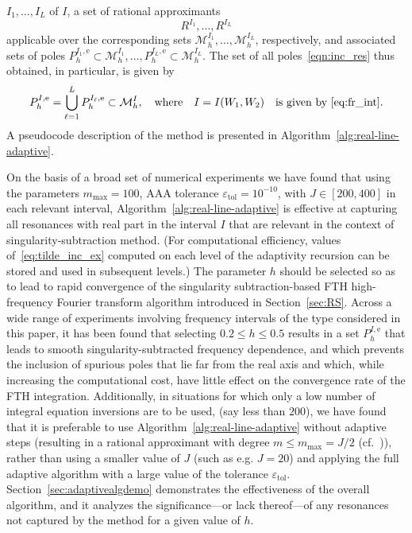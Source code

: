 \documentclass[11pt]{article}
\theoremstyle{plain}
\theoremstyle{remark}
\begin{document}
$I_1,\dots,I_L$ of $I$, a set of rational approximants
\begin{equation}\label{eqn:Rat_approx_set}
    R^{I_1},\dots, R^{I_L}
\end{equation}
applicable over the
corresponding sets $\mathcal{M}^{I_1}_h,\dots, \mathcal{M}^{I_L}_h$,
respectively, and associated sets of poles
$P_{h}^{I_1,\mathrm{e}}\subset \mathcal{M}^{I_1}_h,\dots,P_{h}^{I_L,\mathrm{e}}\subset
\mathcal{M}^{I_L}_h$. The set of all poles~\eqref{eqn:inc_res} thus obtained, in particular, is given by
\begin{equation}
  \label{eq:all_poles}
  P_{h}^{I,\mathrm{e}} = \bigcup_{\ell=1}^L P_{h}^{I_\ell,\mathrm{e}}\subset \mathcal{M}^{I}_h,\quad\text{where}\quad I = I(W_1,W_2)\quad \text{is given by~\eqref{eq:fr_int}}.
\end{equation}
A pseudocode description of the method is presented in Algorithm~\ref{alg:real-line-adaptive}.

On the basis of a broad set of numerical experiments we have found
that using the parameters $m_\mathrm{max} = 100$, AAA tolerance
$\varepsilon_\mathrm{tol} = 10^{-10}$, with $J \in [200,400]$ in each
relevant interval, Algorithm~\ref{alg:real-line-adaptive} is effective
at capturing all resonances with real part in the interval $I$ that
are relevant in the context of singularity-subtraction method. (For
computational efficiency, values of~\eqref{eq:tilde_inc_ex} computed
on each level of the adaptivity recursion can be stored and used in
subsequent levels.) The parameter $h$ should be selected so as to lead
to rapid convergence of the singularity subtraction-based FTH
high-frequency Fourier transform algorithm introduced in
Section~\ref{sec:RS}. Across a wide range of experiments involving
frequency intervals of the type considered in this paper, it has been
found that selecting $0.2\leq h \leq 0.5$ results in a set
$P_{h}^{I,\mathrm{e}}$ that leads to smooth singularity-subtracted
frequency dependence, and which prevents the inclusion of spurious
poles that lie far from the real axis and which, while increasing the
computational cost, have little effect on the convergence rate of the
FTH integration.
Additionally, in situations for which only a low
number of integral equation inversions are to be used, (say less than
$200$), we have found that it is preferable to use
Algorithm~\ref{alg:real-line-adaptive} without adaptive steps
(resulting in a rational approximant with degree
$ m \leq m_\mathrm{max} = J/2$ (cf.~\cite[Sec. 3]{AAA})), rather than
using a smaller value of $J$ (such as e.g. $J = 20$) and applying the
full adaptive algorithm with a large value of the tolerance
$\varepsilon_\mathrm{tol}$. Section~\ref{sec:adaptivealgdemo}
demonstrates the effectiveness of the overall algorithm, and it
analyzes the significance---or lack thereof---of any resonances not
captured by the method for a given value of $h$.
\end{document}
